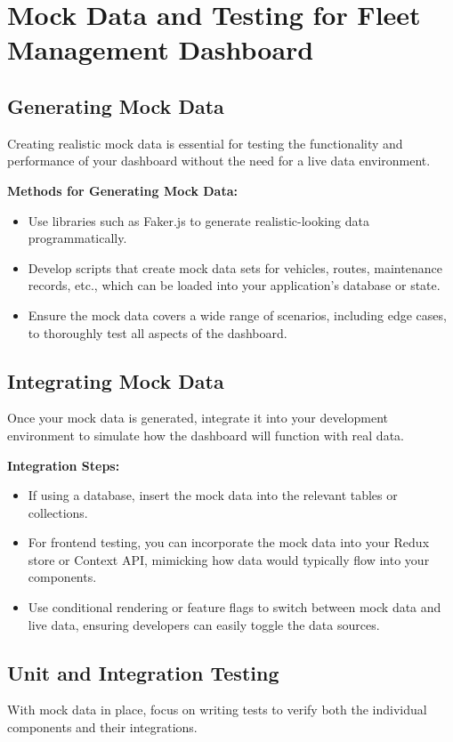 \section*{Mock Data and Testing for Fleet Management Dashboard}

\subsection*{Generating Mock Data}
Creating realistic mock data is essential for testing the functionality and performance of your dashboard without the need for a live data environment.

\textbf{Methods for Generating Mock Data:}
\begin{itemize}
    \item Use libraries such as Faker.js to generate realistic-looking data programmatically.
    \item Develop scripts that create mock data sets for vehicles, routes, maintenance records, etc., which can be loaded into your application's database or state.
    \item Ensure the mock data covers a wide range of scenarios, including edge cases, to thoroughly test all aspects of the dashboard.
\end{itemize}

\subsection*{Integrating Mock Data}
Once your mock data is generated, integrate it into your development environment to simulate how the dashboard will function with real data.

\textbf{Integration Steps:}
\begin{itemize}
    \item If using a database, insert the mock data into the relevant tables or collections.
    \item For frontend testing, you can incorporate the mock data into your Redux store or Context API, mimicking how data would typically flow into your components.
    \item Use conditional rendering or feature flags to switch between mock data and live data, ensuring developers can easily toggle the data sources.
\end{itemize}

\subsection*{Unit and Integration Testing}
With mock data in place, focus on writing tests to verify both the individual components and their integrations.


